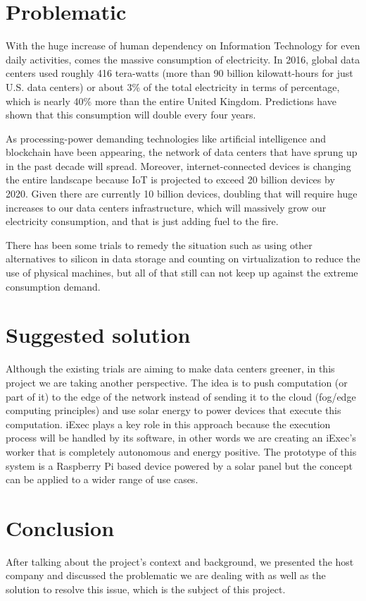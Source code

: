 \section{Problematic}
  With the huge increase of human dependency on Information Technology for even daily activities,
  comes the massive consumption of electricity. In 2016, global data centers used roughly 416
  tera-watts (more than 90 billion kilowatt-hours for just U.S. data centers) or about 3\% of the
  total electricity in terms of percentage, which is nearly 40\% more than the entire United Kingdom.
  Predictions have shown that this consumption will double every four years\cite{consumption-prediction}.

  As processing-power demanding technologies like artificial intelligence and blockchain have
  been appearing, the network of data centers that have sprung up in the past decade will spread.
  Moreover, internet-connected devices is changing the entire landscape because IoT is
  projected to exceed 20 billion devices by 2020. Given there are currently 10 billion devices,
  doubling that will require huge increases to our data centers infrastructure, which will
  massively grow our electricity consumption, and that is just adding fuel to the fire.

  There has been some trials to remedy the situation such as using other alternatives to silicon in
  data storage and counting on virtualization to reduce the use of physical machines, but all of that
  still can not keep up against the extreme consumption demand.

\section{Suggested solution}
  Although the existing trials are aiming to make data centers greener, in this project we are taking another
  perspective. The idea is to push computation (or part of it) to the edge of the network instead of sending
  it to the cloud (fog/edge computing principles) and use solar energy to power devices that execute this
  computation. iExec plays a key role in this approach because the execution process will be handled by its
  software, in other words we are creating an iExec's worker that is completely autonomous and energy positive.
  The prototype of this system is a Raspberry Pi based device powered by a solar panel but the concept can be
  applied to a wider range of use cases.

\section{Conclusion}
  After talking about the project's context and background, we presented the host company and discussed the
  problematic we are dealing with as well as the solution to resolve this issue, which is the subject of this
  project.

\clearpage